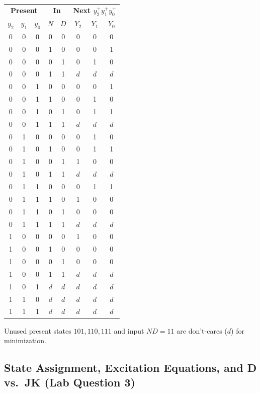 \documentclass[12pt, letterpaper]{article}
\begin{document}
\begin{center}
\footnotesize
\begin{tabular}{|ccc|cc|ccc|}
  \hline
  \multicolumn{3}{|c|}{\textbf{Present}} & \multicolumn{2}{c|}{\textbf{In}} &
  \multicolumn{3}{c|}{\textbf{Next $y_2^+y_1^+y_0^+$}} \\
  $y_2$ & $y_1$ & $y_0$ & $N$ & $D$ & $Y_2$ & $Y_1$ & $Y_0$ \\
  \hline
  0 & 0 & 0 & 0 & 0 & 0 & 0 & 0 \\
  0 & 0 & 0 & 1 & 0 & 0 & 0 & 1 \\
  0 & 0 & 0 & 0 & 1 & 0 & 1 & 0 \\
  0 & 0 & 0 & 1 & 1 & $d$ & $d$ & $d$ \\
  \hline
  0 & 0 & 1 & 0 & 0 & 0 & 0 & 1 \\
  0 & 0 & 1 & 1 & 0 & 0 & 1 & 0 \\
  0 & 0 & 1 & 0 & 1 & 0 & 1 & 1 \\
  0 & 0 & 1 & 1 & 1 & $d$ & $d$ & $d$ \\
  \hline
  0 & 1 & 0 & 0 & 0 & 0 & 1 & 0 \\
  0 & 1 & 0 & 1 & 0 & 0 & 1 & 1 \\
  0 & 1 & 0 & 0 & 1 & 1 & 0 & 0 \\
  0 & 1 & 0 & 1 & 1 & $d$ & $d$ & $d$ \\
  \hline
  0 & 1 & 1 & 0 & 0 & 0 & 1 & 1 \\
  0 & 1 & 1 & 1 & 0 & 1 & 0 & 0 \\
  0 & 1 & 1 & 0 & 1 & 0 & 0 & 0 \\
  0 & 1 & 1 & 1 & 1 & $d$ & $d$ & $d$ \\
  \hline
  1 & 0 & 0 & 0 & 0 & 1 & 0 & 0 \\
  1 & 0 & 0 & 1 & 0 & 0 & 0 & 0 \\
  1 & 0 & 0 & 0 & 1 & 0 & 0 & 0 \\
  1 & 0 & 0 & 1 & 1 & $d$ & $d$ & $d$ \\
  \hline
  1 & 0 & 1 & $d$ & $d$ & $d$ & $d$ & $d$ \\
  1 & 1 & 0 & $d$ & $d$ & $d$ & $d$ & $d$ \\
  1 & 1 & 1 & $d$ & $d$ & $d$ & $d$ & $d$ \\
  \hline
\end{tabular}
\end{center}

Unused present states $101,110,111$ and input $ND{=}11$ are don't-cares ($d$) for minimization.

\subsection{State Assignment, Excitation Equations, and D vs.\ JK (Lab Question 3)}
\end{document}
